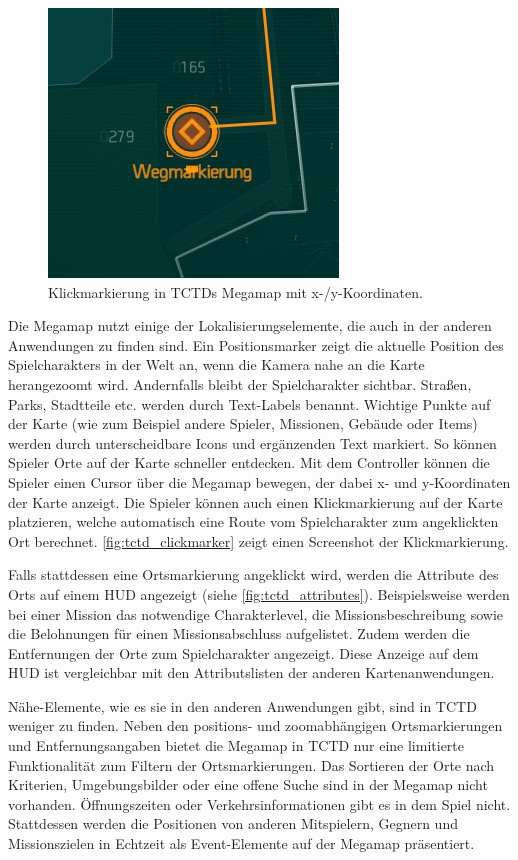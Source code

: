 \begin{figure}[tbh]
    \centering
    \includegraphics[width=0.3\linewidth]{figures/concept/the_division_clickmarker_x}
    \caption{Klickmarkierung in TCTDs Megamap mit x-/y-Koordinaten.}
    \label{fig:tctd_clickmarker}
\end{figure}

Die Megamap nutzt einige der Lokalisierungselemente, die auch in der anderen Anwendungen zu finden sind.
Ein Positionsmarker zeigt die aktuelle Position des Spielcharakters in der Welt an, wenn die Kamera nahe an die Karte herangezoomt wird.
Andernfalls bleibt der Spielcharakter sichtbar.
Straßen, Parks, Stadtteile etc. werden durch Text-Labels benannt.
Wichtige Punkte auf der Karte (wie zum Beispiel andere Spieler, Missionen, Gebäude oder Items) werden durch unterscheidbare Icons und ergänzenden Text markiert.
So können Spieler Orte auf der Karte schneller entdecken.
Mit dem Controller können die Spieler einen Cursor über die Megamap bewegen, der dabei x- und y-Koordinaten der Karte anzeigt.
Die Spieler können auch einen Klickmarkierung auf der Karte platzieren, welche automatisch eine Route vom Spielcharakter zum angeklickten Ort berechnet.
\autoref{fig:tctd_clickmarker} zeigt einen Screenshot der Klickmarkierung.

Falls stattdessen eine Ortsmarkierung angeklickt wird, werden die Attribute des Orts auf einem HUD angezeigt (siehe \autoref{fig:tctd_attributes}).
Beispielsweise werden bei einer Mission das notwendige Charakterlevel, die Missionsbeschreibung sowie die Belohnungen für einen Missionsabschluss aufgelistet.
Zudem werden die Entfernungen der Orte zum Spielcharakter angezeigt.
Diese Anzeige auf dem HUD ist vergleichbar mit den Attributslisten der anderen Kartenanwendungen.

Nähe-Elemente, wie es sie in den anderen Anwendungen gibt, sind in TCTD weniger zu finden.
Neben den positions- und zoomabhängigen Ortsmarkierungen und Entfernungsangaben bietet die Megamap in TCTD nur eine limitierte Funktionalität zum Filtern der Ortsmarkierungen.
Das Sortieren der Orte nach Kriterien, Umgebungsbilder oder eine offene Suche sind in der Megamap nicht vorhanden.
Öffnungszeiten oder Verkehrsinformationen gibt es in dem Spiel nicht.
Stattdessen werden die Positionen von anderen Mitspielern, Gegnern und Missionszielen in Echtzeit als Event-Elemente auf der Megamap präsentiert.

